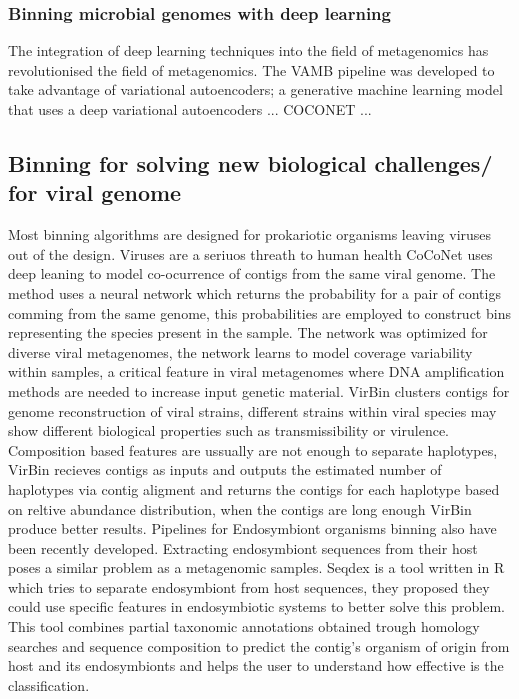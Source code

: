 \documentclass{article}
\begin{document}
\subsubsection{Binning microbial genomes with deep learning}
The integration of deep learning techniques into the field of metagenomics has revolutionised the field of metagenomics.
The \gls{VAMB} pipeline was developed to take advantage of variational autoencoders; a generative machine learning model that uses a deep variational autoencoders \cite{nissenimproved}...
COCONET \cite{arisdakessian2021coconet}...

\subsection{Binning for solving new biological challenges/ for viral genome}
Most binning algorithms are designed for prokariotic organisms leaving viruses out of the design. Viruses are a seriuos threath to human health
CoCoNet uses deep leaning to model co-ocurrence of contigs from the same viral genome. The method uses a neural network which returns the probability for a pair of contigs comming  from the same genome, this probabilities are employed to construct bins representing the species present in the sample. The network was optimized for diverse viral metagenomes, the network learns to model coverage variability within samples, a critical feature in viral metagenomes where DNA amplification methods are needed to increase input genetic material.
VirBin clusters contigs for genome reconstruction of viral strains, different strains within viral species may show different biological properties such as transmissibility or virulence. Composition based features are ussually are not enough to separate haplotypes, VirBin recieves contigs as inputs and outputs the estimated number of haplotypes via contig aligment and returns the contigs for each haplotype based on reltive abundance distribution, when the contigs are long enough VirBin produce better results.
Pipelines for Endosymbiont organisms binning also have been recently developed. Extracting endosymbiont sequences from their host poses a similar problem as a metagenomic samples.  
Seqdex is a tool written in R which tries to separate endosymbiont from host sequences, they proposed they could use specific features in endosymbiotic systems to better solve this problem. This tool combines partial taxonomic annotations obtained trough homology searches and sequence composition to predict the contig's organism of origin from host and its endosymbionts and helps the user to understand how effective is the classification.
\end{document}
